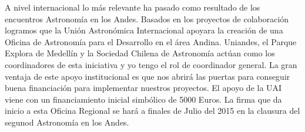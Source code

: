 A nivel internacional lo más relevante ha pasado como resultado de los
encuentros Astronomía en los Andes. Basados en los proyectos de
colaboración logramos que la Unión Astronómica Internacional apoyara
la creación de una Oficina de Astronomía para el Desarrollo en el área
Andina. Uniandes, el Parque Explora de Medellín y la Sociedad Chilena
de Astronomía actúan como los coordinadores de esta iniciativa y yo
tengo el rol de coordinador general. La gran ventaja de este apoyo
institucional es que nos abrirá las puertas para conseguir buena
financiación para implementar nuestros proyectos. El apoyo de la UAI
viene con un financiamiento inicial simbólico de 5000 Euros. La firma
que da inicio a esta Oficina Regional se hará a finales de Julio del
2015 en la clausura del segunod Astronomía en los Andes. 
 




